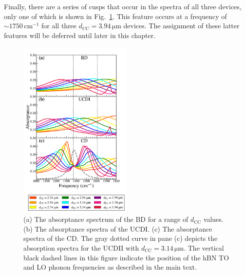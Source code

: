 \documentclass[preprint,
amsmath,amssymb,
aip,
jap,
floatfix,]{revtex4-2}
\begin{document}
			Finally, there are a series of cusps that occur in the spectra of all three devices, only one of which is shown in Fig.~\ref{fig:2}. This feature occurs at a frequency of $\sim 1750\,\mathrm{cm}^{-1}$ for all three $d_\mathrm{CC} = 3.94\,\si{\um}$ devices. The assignment of these latter features will be deferred until later in this chapter.

			\begin{figure}[!htb]
			  \centering\includegraphics[width=0.5\textwidth]{Figures/Fig2.pdf}
			  \caption{(a) The absorptance spectrum of the BD for a range of $d_\mathrm{CC}$ values. (b) The absorptance spectra of the UCDI. (c) The absorptance spectra of the CD. The gray dotted curve in pane (c) depicts the absorption spectra for the UCDII with $d_\mathrm{CC} = 3.14\,\si{\um}$.  The vertical black dashed lines in this figure indicate the position of the hBN TO and LO phonon frequencies as described in the main text.}
			  \label{fig:2}
			\end{figure}
\end{document}
